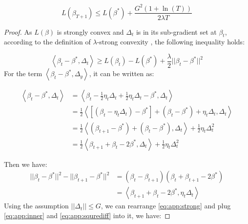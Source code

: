 \begin{theorem}
	
	\begin{equation}
	L(\beta_{T+1}) \leq L(\beta^*)+\frac{G^2(1+\ln (T))}{2\lambda T}
	\end{equation}
\end{theorem}

\begin{proof}
	As $L(\beta)$ is strongly convex and $\Delta_t$ is in its sub-gradient set at $\beta_t$, according to the definition of $\lambda$-strong convexity \cite{rockafellar2015convex}, the following inequality holds:
	
	\begin{equation}\label{eq:app:strong}
		\left\langle {\beta_t - \beta^*,\Delta_t} \right\rangle \geq L(\beta_t)-L(\beta^*)+\frac{\lambda}{2}||\beta_t - \beta^*||^2
	\end{equation} 
	For the term $\left\langle {\beta_t - \beta^*,\Delta_y} \right\rangle$, it can be written as:
	
	\begin{equation} \label{eq:app:inner}
	\begin{aligned}
	\left\langle {\beta_t - \beta^*,\Delta_t} \right\rangle &= \left\langle {\beta_t - \frac{1}{2}\eta_t\Delta_t + \frac{1}{2}\eta_t\Delta_t- \beta^*,\Delta_t} \right\rangle\\
	&=\frac{1}{2}\left\langle {\left[ {\left( {{\beta _t} - {\eta _t}{\Delta _t}} \right) - {\beta ^*}} \right] + \left( {{\beta _t} - {\beta ^*}} \right) + {\eta _t}{\Delta _t},{\Delta _t}} \right\rangle \\
	&= \frac{1}{2}\left\langle {\left( {{\beta _{t + 1}} - {\beta ^*}} \right) + \left( {{\beta _t} - {\beta ^*}} \right),{\Delta _t}} \right\rangle  + \frac{1}{2}{\eta _t}\Delta _t^2\\
	&=\frac{1}{2}\left\langle {{\beta _{t + 1}} + {\beta _t} - 2{\beta ^*},{\Delta _t}} \right\rangle  + \frac{1}{2}{\eta _t}\Delta _t^2
	\end{aligned}
	\end{equation}
	
	Then we have:
	\begin{equation}\label{eq:app:squrediff}
	\begin{aligned}
	||\beta_t-\beta^*||^2-||\beta_{t+1}-\beta^*||^2 &= ( {{\beta _t} - {\beta _{t + 1}}})  ({{\beta _t} + {\beta _{t + 1}} - 2{\beta ^*}}) \\
	&=\left\langle {{\beta _{t + 1}} + {\beta _t} - 2{\beta ^*},{\eta_t\Delta _t}} \right\rangle
	\end{aligned}
	\end{equation}
	Using the assumption $||\Delta_t|| \leq G$, we can rearrange \eqref{eq:app:strong} and plug \eqref{eq:app:inner} and \eqref{eq:app:squrediff} into it, we have:
	

\end{proof}
